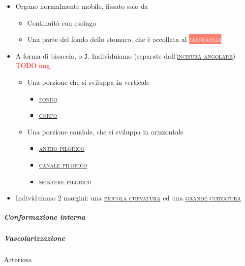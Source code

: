 \documentclass[italian,]{article}
\providecommand{\tightlist}{%
  \setlength{\itemsep}{0pt}\setlength{\parskip}{0pt}}
\newcommand{\mus}[1]{\colorbox{Salmon}{\textcolor{white}{\textsc{#1}}}}
\renewcommand{\a}[1]{\underline{\textsc{#1}}}
\newcommand{\TODO}[1]{\textcolor{red}{\textsf{\footnotesize{TODO #1}}}} %
\begin{document}
\begin{itemize}
\tightlist
\item
  Organo normalmente mobile, fissato solo da

  \begin{itemize}
  \tightlist
  \item
    Continuità con esofago
  \item
    Una parte del fondo dello stomaco, che è accollata al
    \mus{diaframma}
  \end{itemize}
\item
  A forma di bisaccia, o \texttt{J}. Individuiamo (separate
  dall'\a{incisura angolare}) \TODO{img}

  \begin{itemize}
  \tightlist
  \item
    Una porzione che si sviluppa in verticale

    \begin{itemize}
    \tightlist
    \item
      \a{fondo}~
    \item
      \a{corpo}~
    \end{itemize}
  \item
    Una porzione caudale, che si sviluppa in orizzontale

    \begin{itemize}
    \tightlist
    \item
      \a{antro pilorico}~
    \item
      \a{canale pilorico}~
    \item
      \a{sfintere pilorico}~
    \end{itemize}
  \end{itemize}
\item
  Individuiamo 2 margini: una \a{piccola curvatura} ed una
  \a{grande curvatura}
\end{itemize}

\hypertarget{conformazione-interna}{%
\subparagraph{Conformazione interna}\label{conformazione-interna}}

\hypertarget{vascolarizzazione-2}{%
\subparagraph{Vascolarizzazione}\label{vascolarizzazione-2}}

Arteriosa
\end{document}
